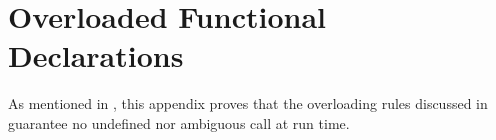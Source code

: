 %
%
%
%

\chapter{Overloaded Functional Declarations}
As mentioned in ,
this appendix proves that the overloading rules discussed in
 guarantee no undefined nor ambiguous call
at run time.



